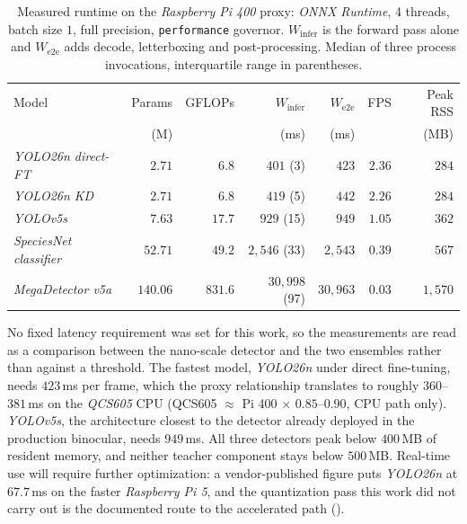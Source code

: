 \begin{table}[htbp]
  \centering
  \caption[Runtime benchmark on the Raspberry Pi 400]{Measured runtime on the \textit{Raspberry Pi 400} proxy: \textit{ONNX Runtime}, 4 threads, batch size $1$, full precision, \texttt{performance} governor. $W_{\mathrm{infer}}$ is the forward pass alone and $W_{\mathrm{e2e}}$ adds decode, letterboxing and post-processing. Median of three process invocations, interquartile range in parentheses.}
  \label{tab:embedded-latency}
  \begin{tabular}{lrrrrrr}
    \toprule
    Model & Params & GFLOPs & $W_{\mathrm{infer}}$ & $W_{\mathrm{e2e}}$ & FPS & Peak RSS \\
     & (M) & & (ms) & (ms) & & (MB) \\
    \midrule
    \textit{YOLO26n direct-FT} & $2.71$ & $6.8$ & $401$ (3) & $423$ & $2.36$ & $284$ \\
    \textit{YOLO26n KD} & $2.71$ & $6.8$ & $419$ (5) & $442$ & $2.26$ & $284$ \\
    \textit{YOLOv5s} & $7.63$ & $17.7$ & $929$ (15) & $949$ & $1.05$ & $362$ \\
    \textit{SpeciesNet classifier} & $52.71$ & $49.2$ & $2,546$ (33) & $2,543$ & $0.39$ & $567$ \\
    \textit{MegaDetector v5a} & $140.06$ & $831.6$ & $30,998$ (97) & $30,963$ & $0.03$ & $1,570$ \\
    \bottomrule
  \end{tabular}
\end{table}

No fixed latency requirement was set for this work, so the measurements are read as a comparison between the nano-scale detector and the two ensembles rather than against a threshold.
The fastest model, \textit{YOLO26n} under direct fine-tuning, needs $423$\,ms per frame, which the proxy relationship translates to roughly $360$--$381$\,ms on the \textit{QCS605} CPU (QCS605 $\approx$ Pi 400 $\times$ $0.85$--$0.90$, CPU path only). \textit{YOLOv5s}, the architecture closest to the detector already deployed in the production binocular, needs $949$\,ms. All three detectors peak below $400$\,MB of resident memory, and neither teacher component stays below $500$\,MB. Real-time use will require further optimization: a vendor-published figure puts \textit{YOLO26n} at $67.7$\,ms on the faster \textit{Raspberry Pi 5},
and the quantization pass this work did not carry out is the documented route to the accelerated path ().

